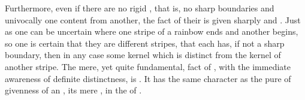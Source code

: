 Furthermore, even if there are no rigid , that is, no sharp
boundaries   and univocally one content from
another, the fact of their  is given sharply and
.  Just as one can be uncertain where one stripe of a rainbow ends
and another begins, so one is certain that they are different stripes, that each
has, if not a sharp boundary, then in any case some kernel which is distinct
from the kernel of another stripe.  The mere, yet quite fundamental, fact of
, with the immediate awareness of definite distinctness, is 
.  It has the same character as the pure  of
givenness of an , its mere , in the 
of .
%
~
